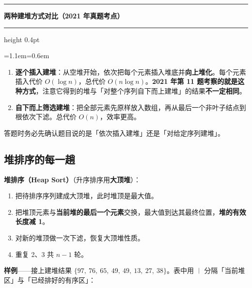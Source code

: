 \documentclass[11pt,openany,UTF8]{ctexbook}
\newcommand{\callouthead}[2]{%
  \par\addvspace{7pt}\noindent
  {\color{#1}\rule[-0.15em]{3pt}{1.05em}}\hspace{0.5em}%
  {\bfseries\color{#1}#2}\par\nobreak\vspace{-0.35em}%
  {\color{rulesep}\hrule height 0.4pt}\nobreak\vspace{0.45em}%
  \begingroup\small\setlength{\parindent}{0pt}%
  \leftskip=1.1em\rightskip=0.6em\noindent\ignorespaces}
\newcommand{\calloutend}{\par\endgroup\addvspace{7pt}}
\newenvironment{callkey}[1]{\callouthead{keybar}{#1}}{\calloutend}
\begin{document}
\begin{callkey}{两种建堆方式对比（2021 年真题考点）}
\begin{enumerate}
\item \textbf{逐个插入建堆}：从空堆开始，依次把每个元素插入堆底并\textbf{向上堆化}。每个元素插入代价 $O(\log n)$，总代价 $O(n\log n)$。\textbf{2021 年第 11 题考察的就是这种方式}，注意它得到的堆与「对整个序列自下而上建堆」的结果\textbf{不一定相同}。
\item \textbf{自下而上筛选建堆}：把全部元素先原样放入数组，再从最后一个非叶子结点到根依次下滤。总代价 $O(n)$，效率更高。
\end{enumerate}
答题时务必先确认题目说的是「依次插入建堆」还是「对给定序列建堆」。

\end{callkey}

\subsection{堆排序的每一趟}

\textbf{堆排序（Heap Sort）}（升序排序用\textbf{大顶堆}）：

\begin{enumerate}
\item 把待排序序列建成大顶堆，此时堆顶是最大值。
\item 把堆顶元素与\textbf{当前堆的最后一个元素}交换，最大值到达其最终位置，\textbf{堆的有效长度减 1}。
\item 对新的堆顶做一次下滤，恢复大顶堆性质。
\item 重复 2、3 共 $n-1$ 轮。
\end{enumerate}
\textbf{样例}——接上建堆结果 $\{97,\ 76,\ 65,\ 49,\ 49,\ 13,\ 27,\ 38\}$。表中用 \texttt{｜} 分隔「当前堆区」与「已经排好的有序区」：
\end{document}
